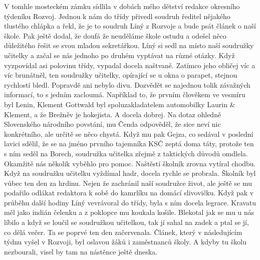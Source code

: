 
V tomhle mosteckém zámku sídlila v dobách mého dětství redakce
okresního týdeníku Rozvoj. Jednou k nám do třídy přivedl soudruh
ředitel nějakého tlustého chlápka a řekl, že je to soudruh Líný z
Rozvoje a bude psát článek o naší škole. Pak ještě dodal, že doufá že
neuděláme škole ostudu a odešel něco důležitého řešit se svou mladou
sekretářkou. Líný si sedl na místo naší soudružky učitelky a začal se
nás jednoho po druhém vyptávat na různé otázky. Když vyzpovídal asi
polovinu třídy, vypadal docela naštvaně. Zatímco jeho obličej víc a
víc brunátněl, ten soudružky učitelky, opírající se u okna o parapet,
stejnou rychlostí bledl. Popravdě ani nebylo divu. Dozvědět se
najednou tolik závažných informací, to s jedním zacloumá. Například
to, že prvním člověkem ve vesmíru byl Lenin, Klement Gottwald byl
spoluzakladatelem automobilky Laurin & Klement, a že Brežněv je
hokejista. A docela dobrej. Na dotaz ohledně Slovenského národního
povstání, mu Čenda odpověděl, že sice neví nic konkrétního, ale určitě
se něco chystá. Když mu pak Gejza, co sedával v poslední lavici
sdělil, že se na jméno prvního tajemníka KSČ zeptá doma táty, protože
ten s ním seděl na Borech, soudružka učitelka zřejmě z taktických
důvodů omdlela. Okamžitě nás několik vyběhlo pro pomoc. Naštěstí
školník zrovna vytíral chodbu. Když na soudružku učitelku vyždímal
hadr, docela rychle se probrala. Školník byl vůbec ten den za hrdinu.
Nejen že zachránil naší soudružce život, ale ještě se mu podařilo
odlákat redaktora k sobě do kamrlíku na domácí slivovičku. Když pak v
průběhu další hodiny Líný vevrávoral do třídy, byla s ním docela
legrace. Kravatu měl jako indián čelenku a z poklopce mu koukala
košile. Blekotal jak se mu u nás líbilo a když se loučil se soudružkou
učitelkou, tak jí sahal na zadek a ptal se jí, co dělá večer. Ta se
poprvé ten den začervenala. Článek, který v následujícím týdnu vyšel v
Rozvoji, byl oslavou žáků i zaměstnanců školy. A kdyby tu školu
nezbourali, visel by tam na nástěnce ještě dneska.

